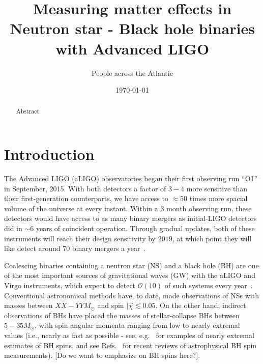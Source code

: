 \documentclass[aps,prd,amsmath,floats,floatfix, twocolumn,
superscriptaddress,nofootinbib,showpacs]{revtex4-1}
\newcommand{\prayush}{\textcolor{red!40!black}}
\begin{document}
\title{
Measuring matter effects in Neutron star - Black hole binaries with Advanced LIGO
}

\author{People across the Atlantic}

\date{\today}

\begin{abstract}
Abstract
\end{abstract}

\pacs{}

\maketitle

\section{Introduction}

The Advanced LIGO (aLIGO) observatories began their first observing run ``O1'' in 
September, 2015. With both detectors a factor of $3-4$ more sensitive than
their first-generation counterparts, we have access to $\approx 50$ times more 
spacial volume of the universe at every instant. Within a 
$3$ month observing run, these detectors would have access to as
many binary mergers as initial-LIGO detectors did in $\sim 6$ years of 
coincident operation. Through gradual updates, both of these instruments will
reach their design sensitivity by $2019$, at which point they will like detect
around $70$ binary mergers a year~\cite{Abadie:2010cf}.

Coalescing binaries containing a neutron star (NS) and a black hole (BH) are
one of the most important sources of gravitational waves (GW) with the aLIGO
and Virgo instruments, which expect to detect $\mathcal{O}(10)$
of such systems every 
year~\cite{Abadie:2010cf}. Conventional astronomical methods have, to date, made 
observations of NSs with masses between $XX-YY M_\odot$ and spin
$|\vec{\chi}\lesssim 0.05$. On the other hand, indirect observations of BHs 
have placed the masses of stellar-collapse BHs between $5-35M_\odot$, with 
spin angular momenta ranging from low to nearly extremal values (i.e., nearly
as fast as possible - see,
e.g.~\cite{McClintockEtAl:2006,Miller:2009cw,Gou:2014una} for examples of 
nearly extremal estimates of BH spins, and see
Refs.~\cite{McClintock:2013vwa,Reynolds:2013qqa} for recent reviews of
astrophysical BH spin measurements). \prayush{[Do we want to emphasize on BH
spins here?]}. 
\end{document}
